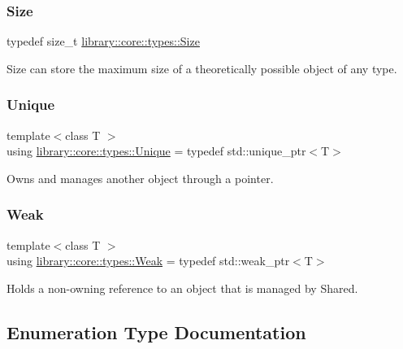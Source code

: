 \subsubsection{\texorpdfstring{Size}{Size}}
{\footnotesize\ttfamily typedef size\+\_\+t \hyperlink{namespacelibrary_1_1core_1_1types_a701626ea1027888ebbb8cfd0ff7adab0}{library\+::core\+::types\+::\+Size}}



Size can store the maximum size of a theoretically possible object of any type. 

\mbox{\label{namespacelibrary_1_1core_1_1types_ac12d38691838fbc9a36765ee62ace52a}} 
\subsubsection{\texorpdfstring{Unique}{Unique}}
{\footnotesize\ttfamily template$<$class T $>$ \\
using \hyperlink{namespacelibrary_1_1core_1_1types_ac12d38691838fbc9a36765ee62ace52a}{library\+::core\+::types\+::\+Unique} = typedef std\+::unique\+\_\+ptr$<$T$>$}



Owns and manages another object through a pointer. 

\mbox{\label{namespacelibrary_1_1core_1_1types_a26c13c272f9fba4ce17ee4980be6703c}} 
\subsubsection{\texorpdfstring{Weak}{Weak}}
{\footnotesize\ttfamily template$<$class T $>$ \\
using \hyperlink{namespacelibrary_1_1core_1_1types_a26c13c272f9fba4ce17ee4980be6703c}{library\+::core\+::types\+::\+Weak} = typedef std\+::weak\+\_\+ptr$<$T$>$}



Holds a non-\/owning reference to an object that is managed by Shared. 



\subsection{Enumeration Type Documentation}
\mbox{\label{namespacelibrary_1_1core_1_1types_a06d9eaa410d43a0fa3f383040618e87d}} 
